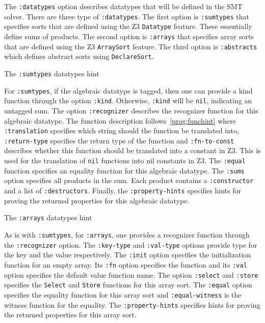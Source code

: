 The \texttt{:datatypes} option describes datatypes that will be defined in the
\acs{SMT} solver. There are three type of \texttt{:datatypes}. The first option
is \texttt{:sumtypes} that specifies sorts that are defined using the Z3
\texttt{Datatype} feature. These essentially define sums of products. The second
option is \texttt{:arrays} that specifies array sorts that are defined using the
Z3 \texttt{ArraySort} feature. The third option is \texttt{:abstracts} which
defines abstract sorts using \texttt{DeclareSort}.

\begin{program}[H]
  \caption{The \texttt{:sumtypes} datatypes hint}
  \label{prog:sumtypehint}
  
\end{program}

For \texttt{:sumtypes}, if the algebraic datatype is tagged, then one can
provide a kind function through the option \texttt{:kind}. Otherwise,
\texttt{:kind} will be \texttt{nil}, indicating an untagged sum. The option
\texttt{:recognizer} describes the recognizer function for this algebraic
datatype. The function description follows~\ref{prog:funchint} where
\texttt{:translation} specifies which string should the function be translated
into, \texttt{:return-type} specifies the return type of the function and
\texttt{:fn-to-const} describes whether this function should be translated into
a constant in Z3. This is used for the translation of \texttt{nil} functions
into nil constants in Z3. The \texttt{:equal} function specifies an equality
function for this algebraic datatype. The \texttt{:sums} option specifies all
products in the sum. Each product contains a \texttt{:constructor} and a list of
\texttt{:destructors}. Finally, the \texttt{:property-hints} specifies hints for
proving the returned properties for this algebraic datatype.

\begin{program}[h]
  \caption{The \texttt{:arrays} datatypes hint}
  \label{prog:arrayhint}
  
\end{program}

As is with \texttt{:sumtypes}, for \texttt{:arrays}, one provides a recognizer
function through the \texttt{:recognizer} option. The \texttt{:key-type} and
\texttt{:val-type} options provide type for the key and the value respectively.
The \texttt{:init} option specifies the initialization function for an empty
array. Its \texttt{:fn} option specifies the function and its \texttt{:val}
option specifies the default value function name. The option \texttt{:select}
and \texttt{:store} specifies the \texttt{Select} and \texttt{Store} functions
for this array sort. The \texttt{:equal} option specifies the equality function
for this array sort and \texttt{:equal-witness} is the witness function for the
equality. The \texttt{:property-hints} specifies hints for proving the returned
properties for this array sort.

